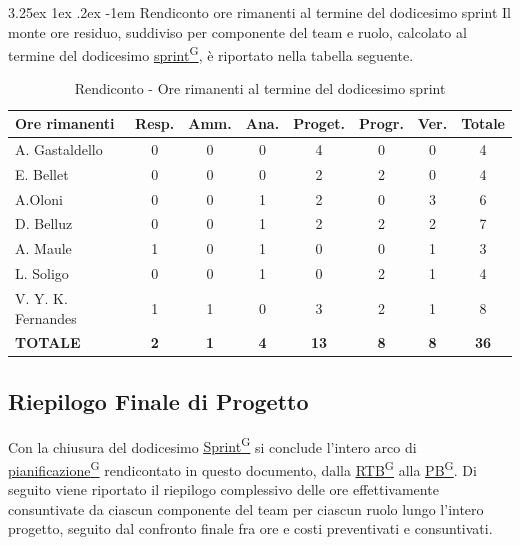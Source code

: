 \documentclass[a4paper,12pt]{article}
\makeatletter
\renewcommand\paragraph{\@startsection{paragraph}{5}{\z@}%
  {3.25ex \@plus1ex \@minus.2ex}%
  {-1em}%
  {\normalfont\normalsize\bfseries}}
\providecommand{\glslink}[2]{\href{https://alittlebyte-19.github.io/Documentazione/glossario.html\#gls-#1}{\underline{#2}\textsuperscript{\scriptsize G}}}
\makeatother
\begin{document}
\paragraph{Rendiconto ore rimanenti al termine del dodicesimo sprint}
Il monte ore residuo, suddiviso per componente del team e ruolo, calcolato al termine del dodicesimo \glslink{sprint}{sprint}, è riportato nella tabella seguente.
\begin{table}[htbp]
\centering
\renewcommand{\arraystretch}{1.5}
\begin{tabularx}{\textwidth}{|X|c|c|c|c|c|c|c|}
\hline
\textbf{Ore rimanenti} & \textbf{Resp.} & \textbf{Amm.} & \textbf{Ana.} & \textbf{Proget.} & \textbf{Progr.} & \textbf{Ver.} & \textbf{Totale} \\
\hline
A. Gastaldello & 0 & 0 & 0 & 4 & 0 & 0 & 4 \\
\hline
E. Bellet & 0 & 0 & 0 & 2 & 2 & 0 & 4 \\
\hline
A.Oloni & 0 & 0 & 1 & 2 & 0 & 3 & 6 \\
\hline
D. Belluz & 0 & 0 & 1 & 2 & 2 & 2 & 7 \\
\hline
A. Maule & 1 & 0 & 1 & 0 & 0 & 1 & 3 \\
\hline
L. Soligo & 0 & 0 & 1 & 0 & 2 & 1 & 4 \\
\hline
V. Y. K. Fernandes & 1 & 1 & 0 & 3 & 2 & 1 & 8 \\
\hline
\rowcolor{gray!20}
\textbf{TOTALE} & \textbf{2} & \textbf{1} & \textbf{4} & \textbf{13} & \textbf{8} & \textbf{8} & \textbf{36} \\
\hline
\end{tabularx}
\caption{Rendiconto - Ore rimanenti al termine del dodicesimo sprint}
\end{table}


\newpage


\subsection{Riepilogo Finale di Progetto}
\label{sec:riepilogo_finale_progetto}

Con la chiusura del dodicesimo \glslink{sprint}{Sprint} si conclude l'intero arco di \glslink{pianificazione}{pianificazione} rendicontato in questo documento, dalla \glslink{rtb-requirements-and-technology-baseline}{RTB} alla \glslink{pb-product-baseline}{PB}. Di seguito viene riportato il riepilogo complessivo delle ore effettivamente consuntivate da ciascun componente del team per ciascun ruolo lungo l'intero progetto, seguito dal confronto finale fra ore e costi preventivati e consuntivati.
\end{document}
